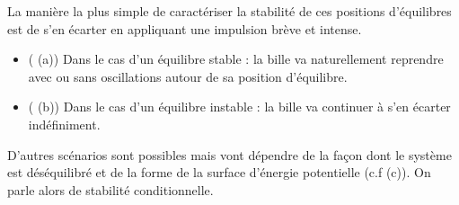 La manière la plus simple de caractériser la stabilité de ces positions 
d'équilibres est de s'en écarter en appliquant une impulsion brève et intense. 
\begin{itemize}
    \item ( (a)) Dans le cas d'un équilibre stable : 
        la bille va naturellement reprendre avec ou sans oscillations 
        autour de sa position d'équilibre. 
    \item ( (b)) Dans le cas d'un équilibre instable :
        la bille va continuer à s'en écarter indéfiniment. 
\end{itemize}
D'autres scénarios sont possibles mais vont dépendre de la façon dont le 
système est déséquilibré et de la forme de la surface d'énergie potentielle 
(c.f  (c)). On parle alors de stabilité conditionnelle.

